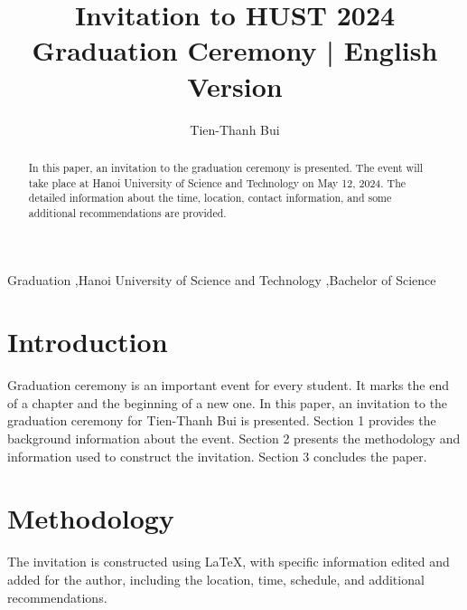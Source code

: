 \documentclass[final,5p,times,twocolumn, 8pt, a4paper]{elsarticle}
\begin{document}
    \begin{frontmatter}


        \title{Invitation to HUST 2024 Graduation Ceremony | English Version}

        \author[1]{Tien-Thanh Bui}







        \begin{abstract}
            In this paper, an invitation to the graduation ceremony is presented. The event will take place at Hanoi University of Science and Technology on May 12, 2024. The detailed information about the time, location, contact information, and some additional recommendations are provided. 

        \end{abstract}

        \begin{keyword}
            Graduation \sep Hanoi University of Science and Technology \sep Bachelor of Science
        \end{keyword}

    \end{frontmatter}


    \section{Introduction}
        \par Graduation ceremony is an important event for every student. It marks the end of a chapter and the beginning of a new one. In this paper, an invitation to the graduation ceremony for Tien-Thanh Bui is presented. Section 1 provides the background information about the event. Section 2 presents the methodology and information used to construct the invitation. Section 3 concludes the paper.


    \section{Methodology}
        \par The invitation is constructed using LaTeX, with specific information edited and added for the author, including the location, time, schedule, and additional recommendations.
\end{document}
